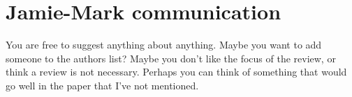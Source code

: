 \documentclass[preprint,authoryear,12pt]{elsarticle}
\begin{document}
\section{Jamie-Mark communication}
You are free to suggest anything about anything.
Maybe you want to add someone to the authors list?
Maybe you don't like the focus of the review, or think a review is not necessary.
Perhaps you can think of something that would go well in the paper that I've not mentioned.





\end{document}
